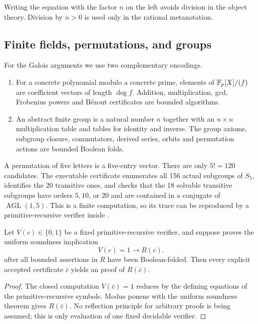 Writing the equation with the factor \(n\) on the left avoids division in the
object theory.  Division by \(n>0\) is used only in the rational metanotation.

\subsection{Finite fields, permutations, and groups}

For the Galois arguments we use two complementary encodings.

\begin{enumerate}
\item For a concrete polynomial modulo a concrete prime, elements of
      \(\mathbb F_p[X]/(f)\) are coefficient vectors of length \(\deg f\).  Addition,
      multiplication, gcd, Frobenius powers and Bézout certificates are
      bounded algorithms.
\item An abstract finite group is a natural number \(n\) together with an
      \(n\times n\) multiplication table and tables for identity and inverse.
      The group axioms, subgroup closure, commutators, derived series, orbits
      and permutation actions are bounded Boolean folds.
\end{enumerate}

A permutation of five letters is a five-entry vector.  There are only
\(5!=120\) candidates.  The executable certificate enumerates all 156 actual
subgroups of \(S_5\), identifies the 20 transitive ones, and checks that the 18
solvable transitive subgroups have orders \(5,10\), or \(20\) and are contained
in a conjugate of \(\operatorname{AGL}(1,5)\).  This is a finite computation,
so its trace can be reproduced by a primitive-recursive verifier inside
\ipra.

\begin{lemma}\label{lem:certificate-reflection}
Let \(V(c)\in\{0,1\}\) be a fixed primitive-recursive verifier, and suppose
\ipra{} proves the uniform soundness implication
\[
 V(c)=1\longrightarrow R(c).
\]
after all bounded assertions in \(R\) have been Boolean-folded.  Then every
explicit accepted certificate \(\bar c\) yields an \ipra{} proof of
\(R(\bar c)\).
\end{lemma}

\begin{proof}
The closed computation \(V(\bar c)=1\) reduces by the defining equations of the
primitive-recursive symbols.  Modus ponens with the uniform soundness theorem
gives \(R(\bar c)\).  No reflection principle for arbitrary proofs is being
assumed; this is only evaluation of one fixed decidable verifier.
\end{proof}

